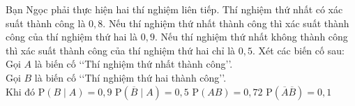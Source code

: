 \begin{ex}%
	Bạn Ngọc phải thực hiện hai thí nghiệm liên tiếp. Thí nghiệm thứ nhất có xác suất thành công là $0{,}8$. Nếu thí nghiệm thứ nhất thành công thì xác suất thành công của thí nghiệm thứ hai là $0{,}9$. Nếu thí nghiệm thứ nhất không thành công thì xác suất thành công của thí nghiệm thứ hai chỉ là $0{,}5$. Xét các biến cố sau:\\ 
	Gọi $A$ là biến  cố \lq\lq Thí nghiệm thứ nhất thành công\rq\rq.\\
	 Gọi $B$ là biến cố \lq\lq Thí nghiệm thứ hai thành công\rq\rq.\\
	Khi  đó
	 \choiceTF
		 {\True $\mathrm{P}(B\mid A)=0{,}9$}
		{$\mathrm{P}\left(\overline{B}\mid  A\right)=0{,}5$}
		{\True $\mathrm{P}(AB)=0{,}72$} 
		{\True  $\mathrm{P}\left(\overline{A} \overline{B}\right)=0{,}1$}
\end{ex}

